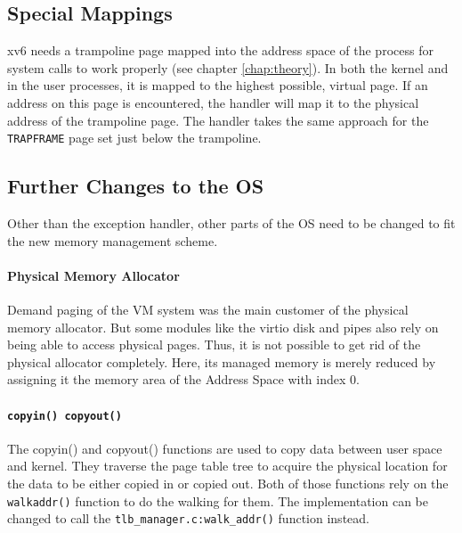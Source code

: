 
\subsection{Special Mappings}
xv6 needs a trampoline page mapped into the address space of the process for system calls to work properly (see chapter \ref{chap:theory}).
In both the kernel and in the user processes, it is mapped to the highest possible, virtual page.
If an address on this page is encountered, the handler will map it to the physical address of the trampoline page.
The handler takes the same approach for the \texttt{TRAPFRAME} page set just below the trampoline.

\subsection{Further Changes to the OS}
Other than the exception handler, other parts of the OS need to be changed to fit the new memory management scheme.

\paragraph{Physical Memory Allocator} %
Demand paging of the VM system was the main customer of the physical memory allocator.
But some modules like the virtio disk and pipes also rely on being able to access physical pages. Thus, it is not
possible to get rid of the physical allocator completely.
Here, its managed memory is merely reduced by assigning it the memory area of the Address Space with index 0.

\paragraph{\texttt{copyin() copyout()}} The copyin() and copyout() functions are used to copy data between
user space and kernel. They traverse the page table tree to acquire the physical location for the data
to be either copied in or copied out.
Both of those functions rely on the \texttt{walkaddr()} function to do the walking for them.
The implementation can be changed to call the \texttt{tlb\_manager.c:walk\_addr()} function instead.

